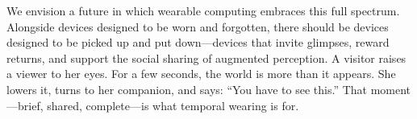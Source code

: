 We envision a future in which wearable computing embraces this full spectrum. Alongside devices designed to be worn and forgotten, there should be devices designed to be picked up and put down---devices that invite glimpses, reward returns, and support the social sharing of augmented perception. A visitor raises a viewer to her eyes. For a few seconds, the world is more than it appears. She lowers it, turns to her companion, and says: ``You have to see this.'' That moment---brief, shared, complete---is what temporal wearing is for.
